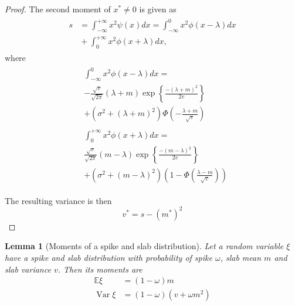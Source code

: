 \documentclass{article}
\newtheorem{lemma}{Lemma}
\begin{document}
\begin{proof}
The second moment of $x^* \neq 0$ is given as
\begin{align}
\label{eq:thr_second_moment}
\begin{split}
s &= \int_{-\infty}^{+\infty}x^2\psi(x)dx = \int_{-\infty}^{0}x^2\phi(x-\lambda)dx \\
&{}+ \int_{0}^{+\infty}x^2\phi(x+\lambda)dx,
\end{split}
\end{align}
where
\begin{align}
\begin{split}
&\int_{-\infty}^{0}x^2\phi(x-\lambda)dx = \\
&-\frac{\sqrt{v}}{\sqrt{2\pi}} (\lambda+m)\exp\left\{\frac{-(\lambda+m)^2}{2v}\right\}\\
& + (\sigma^2 + (\lambda+m)^2)\Phi\left(-\frac{\lambda+m}{\sqrt{v}}\right)
\end{split}\\
\begin{split}
&\int_{0}^{+\infty}x^2\phi(x+\lambda)dx = \\
&\frac{\sqrt{v}}{\sqrt{2\pi}} (m - \lambda)\exp\left\{\frac{-(m - \lambda)^2}{2v}\right\}\\
& + (\sigma^2 + (m - \lambda)^2)\left(1 - \Phi\left(\frac{\lambda -m}{\sqrt{v}}\right)\right)
\end{split}
\end{align}

The resulting variance is then
\begin{equation}
v^* = s- (m^*)^2
\end{equation}
\end{proof}

\begin{lemma}[Moments of a spike and slab distribution]
\label{thm:moments_spsl}
Let a random variable $\xi$ have a spike and slab distribution with probability of spike $\omega$, slab mean $m$ and slab variance $v$. Then its moments are
\begin{subequations}
\begin{align}
\mathbb{E}\xi &= (1-\omega)m \\
\operatorname{Var}\xi & = (1-\omega)(v + \omega m^2)
\end{align}
\end{subequations}
\end{lemma}
\end{document}
